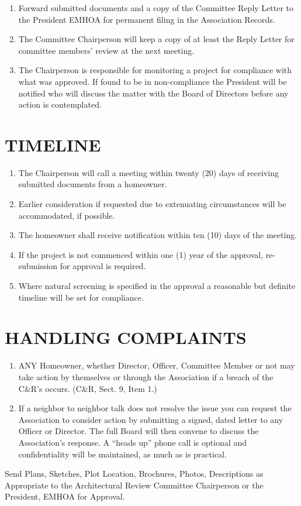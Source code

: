 \documentclass[10pt, letterpaper]{article}
\begin{document}
\begin{enumerate}
  \item Forward submitted documents and a copy of the Committee Reply Letter to the President EMHOA for permanent filing in the Association Records.
  \item The Committee Chairperson will keep a copy of at least the Reply Letter for committee members' review at the next meeting.
  \item The Chairperson is responsible for monitoring a project for compliance with what was approved.
    If found to be in non-compliance the President will be notified who will discuss the matter with the Board of Directors before any action is contemplated.
\end{enumerate}

\section{TIMELINE}
\begin{enumerate}
  \item The Chairperson will call a meeting within twenty (20) days of receiving submitted documents from a homeowner.
  \item Earlier consideration if requested due to extenuating circumstances will be accommodated, if possible.
  \item The homeowner shall receive notification within ten (10) days of the meeting.
  \item If the project is not commenced within one (1) year of the approval, re-submission for approval is required.
  \item Where natural screening is specified in the approval a reasonable but definite timeline will be set for compliance.
\end{enumerate}

\section{HANDLING COMPLAINTS}
\begin{enumerate}
  \item ANY Homeowner, whether Director, Officer, Committee Member or not may take action by themselves or through the Association if a breach of the C\&R's occurs.
    \hfill (C\&R, Sect. 9, Item 1.)
  \item If a neighbor to neighbor talk does not resolve the issue you can request the Association to consider action by submitting a signed, dated letter to any Officer or Director.
    The full Board will then convene to discuss the Association's response.
    A ``heads up'' phone call is optional and confidentiality will be maintained, as much as is practical.
\end{enumerate}

Send Plans, Sketches, Plot Location, Brochures, Photos, Descriptions as Appropriate to the Architectural Review Committee Chairperson or the President, EMHOA for Approval.
\end{document}
